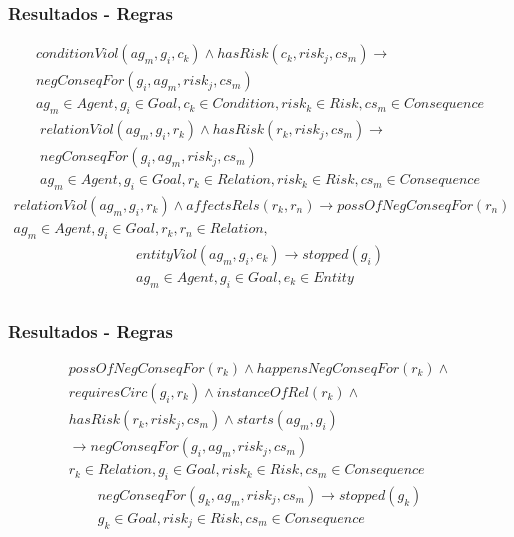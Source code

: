 \documentclass{beamer}
\begin{document}
\begin{frame}
	\frametitle{Resultados - Regras}
	\begin{eqnarray}\label{consconditionViol}\nonumber
		conditionViol(ag_m,g_i,c_k)  \wedge hasRisk(c_k,risk_j,cs_m) \to \nonumber \\ 
		negConseqFor(g_i,ag_m,risk_j,cs_m) \nonumber \\ 
    	ag_m \in Agent, g_i \in Goal, c_k \in Condition, risk_k \in Risk, cs_m \in Consequence
	\end{eqnarray}
	\begin{eqnarray}\label{consrelationViol}\nonumber
		relationViol(ag_m,g_i,r_k) \wedge hasRisk(r_k,risk_j,cs_m) \to \nonumber \\ 
		negConseqFor(g_i,ag_m,risk_j,cs_m) \nonumber \\ 
	    ag_m \in Agent, g_i \in Goal, r_k \in Relation, risk_k \in Risk, cs_m \in Consequence 
	\end{eqnarray}
	\begin{eqnarray}\label{entityViolaffect}
		relationViol(ag_m,g_i,r_k) \wedge affectsRels(r_k,r_n) \to possOfNegConseqFor(r_n)  \nonumber \\
	    ag_m \in Agent, g_i \in Goal, r_k,r_n \in Relation, 
	\end{eqnarray}
	\begin{eqnarray}\label{consvioent}
		entityViol(ag_m,g_i,e_k) \to stopped(g_i) \nonumber \\  
    	ag_m \in Agent, g_i \in Goal, e_k \in Entity \\ \nonumber
	\end{eqnarray}
\end{frame}

\begin{frame}
	\frametitle{Resultados - Regras}
	\begin{eqnarray}\label{paybutiamnotguilty}
		possOfNegConseqFor(r_k) \wedge  happensNegConseqFor(r_k) \wedge \nonumber \\
		requiresCirc(g_i,r_k) \wedge instanceOfRel(r_k) \wedge \nonumber \\ 
		hasRisk(r_k,risk_j,cs_m) \wedge starts(ag_m,g_i) \nonumber \\ 
		\to negConseqFor(g_i,ag_m,risk_j,cs_m) \nonumber \\ 
	    r_k \in Relation, g_i \in Goal, risk_k \in Risk, cs_m \in Consequence
	\end{eqnarray}
	 \begin{eqnarray}\label{badcons}
		negConseqFor(g_k,ag_m,risk_j,cs_m) \to stopped(g_k) \nonumber \\ 
	    g_k \in Goal, risk_j \in Risk, cs_m \in Consequence
	\end{eqnarray}	
\end{frame}
\end{document}
